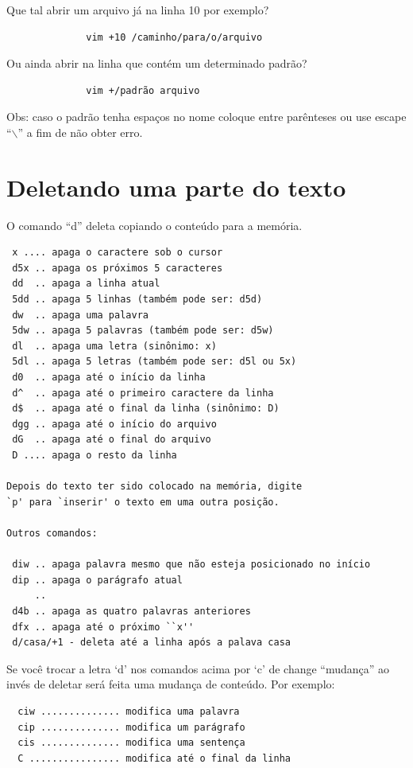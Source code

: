 \documentclass[10pt,a4paper,openany]{book}
\begin{document}
Que tal abrir um arquivo já na linha 10 por exemplo?

\begin{verbatim}
			  vim +10 /caminho/para/o/arquivo
\end{verbatim}

Ou ainda abrir na linha que contém um determinado padrão?

\begin{verbatim}
			  vim +/padrão arquivo
\end{verbatim}

Obs: caso o padrão tenha espaços no nome coloque entre parênteses ou
use escape ``$\backslash$'' a fim de não obter erro.

\section{Deletando uma parte do texto}\label{Deletando uma parte do texto}

O comando ``d'' deleta copiando o conteúdo para a memória.

\begin{verbatim}
 x .... apaga o caractere sob o cursor
 d5x .. apaga os próximos 5 caracteres
 dd  .. apaga a linha atual
 5dd .. apaga 5 linhas (também pode ser: d5d)
 dw  .. apaga uma palavra
 5dw .. apaga 5 palavras (também pode ser: d5w)
 dl  .. apaga uma letra (sinônimo: x)
 5dl .. apaga 5 letras (também pode ser: d5l ou 5x)
 d0  .. apaga até o início da linha
 d^  .. apaga até o primeiro caractere da linha
 d$  .. apaga até o final da linha (sinônimo: D)
 dgg .. apaga até o início do arquivo
 dG  .. apaga até o final do arquivo
 D .... apaga o resto da linha

Depois do texto ter sido colocado na memória, digite
`p' para `inserir' o texto em uma outra posição.

Outros comandos:

 diw .. apaga palavra mesmo que não esteja posicionado no início
 dip .. apaga o parágrafo atual
     ..
 d4b .. apaga as quatro palavras anteriores
 dfx .. apaga até o próximo ``x''
 d/casa/+1 - deleta até a linha após a palava casa

\end{verbatim}

Se você trocar a letra `d' nos comandos acima por `c' de change
``mudança'' ao invés de deletar será feita uma mudança de conteúdo.
Por exemplo:

\begin{verbatim}
  ciw .............. modifica uma palavra
  cip .............. modifica um parágrafo
  cis .............. modifica uma sentença
  C ................ modifica até o final da linha
\end{verbatim}
\end{document}

